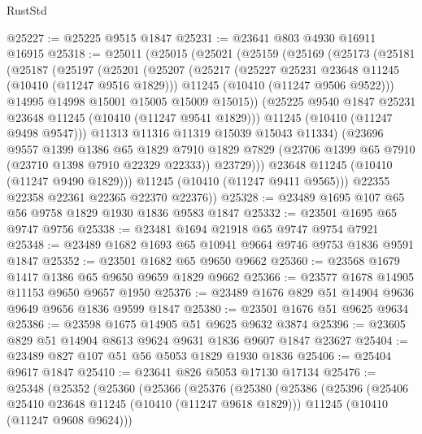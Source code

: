 \begin{lexlean}{RustStd}
\begin{coremodule}
@25227 := @25225 @9515 @1847
@25231 := @23641 @803 @4930 @16911 @16915
@25318 := @25011
    (@25015
      (@25021
        (@25159
          (@25169
            (@25173
              (@25181
                (@25187
                  (@25197
                    (@25201
                      (@25207
                        (@25217
                          (@25227 @25231 @23648 @11245 (@10410 (@11247 @9516 @1829)))
                          @11245
                          (@10410 (@11247 @9506 @9522)))
                        @14995
                        @14998
                        @15001
                        @15005
                        @15009
                        @15015))
                    (@25225 @9540 @1847 @25231 @23648 @11245 (@10410 (@11247 @9541 @1829)))
                    @11245
                    (@10410 (@11247 @9498 @9547)))
                  @11313
                  @11316
                  @11319
                  @15039
                  @15043
                  @11334)
                (@23696
                  @9557
                  @1399
                  @1386
                  @65
                  @1829
                  @7910
                  @1829
                  @7829
                  (@23706 @1399 @65 @7910 (@23710 @1398 @7910 @22329 @22333))
                  @23729)))
            @23648
            @11245
            (@10410 (@11247 @9490 @1829)))
          @11245
          (@10410 (@11247 @9411 @9565)))
        @22355
        @22358
        @22361
        @22365
        @22370
        @22376))
@25328 := @23489 @1695 @107 @65 @56 @9758 @1829 @1930 @1836 @9583 @1847
@25332 := @23501 @1695 @65 @9747 @9756
@25338 := @23481 @1694 @21918 @65 @9747 @9754 @7921
@25348 := @23489 @1682 @1693 @65 @10941 @9664 @9746 @9753 @1836 @9591 @1847
@25352 := @23501 @1682 @65 @9650 @9662
@25360 := @23568 @1679 @1417 @1386 @65 @9650 @9659 @1829 @9662
@25366 := @23577 @1678 @14905 @11153 @9650 @9657 @1950
@25376 := @23489 @1676 @829 @51 @14904 @9636 @9649 @9656 @1836 @9599 @1847
@25380 := @23501 @1676 @51 @9625 @9634
@25386 := @23598 @1675 @14905 @51 @9625 @9632 @3874
@25396 := @23605 @829 @51 @14904 @8613 @9624 @9631 @1836 @9607 @1847 @23627
@25404 := @23489 @827 @107 @51 @56 @5053 @1829 @1930 @1836
@25406 := @25404 @9617 @1847
@25410 := @23641 @826 @5053 @17130 @17134
@25476 := @25348
    (@25352
      (@25360
        (@25366
          (@25376
            (@25380
              (@25386
                (@25396
                  (@25406 @25410 @23648 @11245 (@10410 (@11247 @9618 @1829)))
                  @11245
                  (@10410 (@11247 @9608 @9624)))

\end{coremodule}
\end{lexlean}
